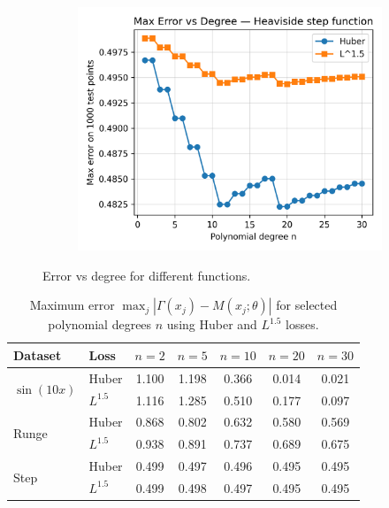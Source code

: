 \documentclass[a4paper,12pt]{article}
\begin{document}
\begin{figure}[h!]
    \begin{subfigure}[b]{0.49\linewidth}
        \centering
        \includegraphics[width=\linewidth]{fig/exercise3_error_vs_degree_Heaviside_step_function.png}
    \end{subfigure}
    
    \caption{Error vs degree for different functions.}
    \label{fig:error-vs-degree}
\end{figure}


\begin{table}[h!]
\centering
\caption{Maximum error $\max_j |\Gamma(x_j) - M(x_j;\theta)|$ 
for selected polynomial degrees $n$ using Huber and $L^{1.5}$ losses.}
\begin{tabular}{llccccc}
\toprule
Dataset & Loss & $n=2$ & $n=5$ & $n=10$ & $n=20$ & $n=30$ \\
\midrule
\multirow{2}{*}{$\sin(10x)$} 
  & Huber        & 1.100 & 1.198 & 0.366 & 0.014 & 0.021 \\
  & $L^{1.5}$    & 1.116 & 1.285 & 0.510 & 0.177 & 0.097 \\
\midrule
\multirow{2}{*}{Runge} 
  & Huber        & 0.868 & 0.802 & 0.632 & 0.580 & 0.569 \\
  & $L^{1.5}$    & 0.938 & 0.891 & 0.737 & 0.689 & 0.675 \\
\midrule
\multirow{2}{*}{Step} 
  & Huber        & 0.499 & 0.497 & 0.496 & 0.495 & 0.495 \\
  & $L^{1.5}$    & 0.499 & 0.498 & 0.497 & 0.495 & 0.495 \\
\bottomrule
\end{tabular}
\label{tab:max-error}
\end{table}
\end{document}

